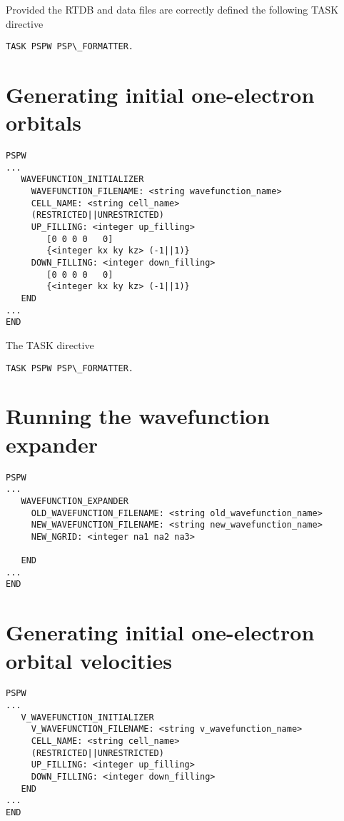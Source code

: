 Provided the RTDB and data files are correctly defined
the following TASK directive
\begin{verbatim}
TASK PSPW PSP\_FORMATTER.
\end{verbatim}


\section{Generating initial one-electron orbitals}

\begin{verbatim}
PSPW
... 
   WAVEFUNCTION_INITIALIZER
     WAVEFUNCTION_FILENAME: <string wavefunction_name>
     CELL_NAME: <string cell_name>
     (RESTRICTED||UNRESTRICTED)
     UP_FILLING: <integer up_filling>
        [0 0 0 0   0]
        {<integer kx ky kz> (-1||1)}
     DOWN_FILLING: <integer down_filling>
        [0 0 0 0   0]
        {<integer kx ky kz> (-1||1)}
   END
...
END
\end{verbatim}


The TASK directive
\begin{verbatim}
TASK PSPW PSP\_FORMATTER.
\end{verbatim}




\section{Running the wavefunction expander}


\begin{verbatim}
PSPW
... 
   WAVEFUNCTION_EXPANDER   
     OLD_WAVEFUNCTION_FILENAME: <string old_wavefunction_name>
     NEW_WAVEFUNCTION_FILENAME: <string new_wavefunction_name>
     NEW_NGRID: <integer na1 na2 na3>
    
   END
...
END
\end{verbatim}



\section{Generating initial one-electron orbital velocities}

\begin{verbatim}
PSPW
... 
   V_WAVEFUNCTION_INITIALIZER
     V_WAVEFUNCTION_FILENAME: <string v_wavefunction_name>
     CELL_NAME: <string cell_name>
     (RESTRICTED||UNRESTRICTED)
     UP_FILLING: <integer up_filling>
     DOWN_FILLING: <integer down_filling>
   END
...
END
\end{verbatim}


